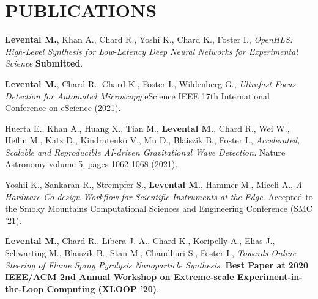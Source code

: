 \documentclass[11pt,letterpaper,roman,colorlinks,linkcolor=blue]{moderncv}
\newcommand*{\modern}{\fontfamily{qhv}\selectfont}
\newcommand{\mystyle}[1]{\textcolor{mygrey}{\modern #1}}
\newcommand{\mysectionstyle}[1]{\large\mystyle{#1}}
\begin{document}

\section{\mysectionstyle{PUBLICATIONS}}


\begin{hangingpar}
\textbf{Levental M.}, Khan A., Chard R., Yoshi K., Chard K., Foster I.,
\textit{OpenHLS: High-Level Synthesis for Low-Latency Deep Neural Networks for Experimental Science} 
\textbf{Submitted}.
\end{hangingpar}

\begin{hangingpar}
\textbf{Levental M.}, Chard R., Chard K., Foster I., Wildenberg G.,
\textit{Ultrafast Focus Detection for Automated Microscopy} 
eScience IEEE 17th International Conference on eScience (2021).
\end{hangingpar}


\begin{hangingpar}
Huerta E., Khan A., Huang X., Tian M., \textbf{Levental M.}, Chard R., Wei W., Heflin M., Katz D., Kindratenko V., Mu D., Blaiszik B., Foster I.,
\textit{Accelerated, Scalable and Reproducible AI-driven Gravitational Wave Detection.} 
Nature Astronomy volume 5, pages 1062-1068 (2021).
\end{hangingpar}

\begin{hangingpar}
Yoshii K., Sankaran R., Strempfer S., \textbf{Levental M.}, Hammer M., Miceli A.,
\textit{A Hardware Co-design Workflow for Scientific Instruments at the Edge.} 
Accepted to the Smoky Mountains Computational Sciences and Engineering Conference (SMC '21).
\end{hangingpar}

\begin{hangingpar}
\textbf{Levental M.}, Chard R., Libera J. A., Chard K., Koripelly A., Elias J., Schwarting M., Blaiszik B., Stan M., Chaudhuri S., Foster I.,
\textit{Towards Online Steering of Flame Spray Pyrolysis Nanoparticle Synthesis.} 
\textbf{Best Paper at 2020 IEEE/ACM 2nd Annual Workshop on Extreme-scale Experiment-in-the-Loop Computing (XLOOP '20)}.
\end{hangingpar}
\end{document}
